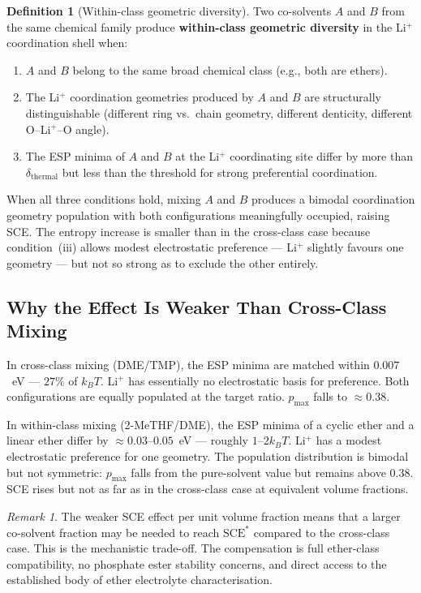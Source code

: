 \documentclass[11pt]{article}
\theoremstyle{plain}
\theoremstyle{definition}
\newtheorem{definition}{Definition}[section]
\theoremstyle{remark}
\newtheorem{remark}{Remark}[section]
\begin{document}
\begin{definition}[Within-class geometric diversity]
Two co-solvents $A$ and $B$ from the same chemical family produce
\textbf{within-class geometric diversity} in the Li$^+$ coordination
shell when:
\begin{enumerate}[label=(\roman*)]
  \item $A$ and $B$ belong to the same broad chemical class
        (e.g., both are ethers).
  \item The Li$^+$ coordination geometries produced by $A$ and $B$
        are structurally distinguishable (different ring vs.\ chain
        geometry, different denticity, different O--Li$^+$--O angle).
  \item The ESP minima of $A$ and $B$ at the Li$^+$ coordinating
        site differ by more than $\delta_{\mathrm{thermal}}$ but less
        than the threshold for strong preferential coordination.
\end{enumerate}
When all three conditions hold, mixing $A$ and $B$ produces a
bimodal coordination geometry population with both configurations
meaningfully occupied, raising SCE.  The entropy increase is smaller
than in the cross-class case because condition~(iii) allows modest
electrostatic preference --- Li$^+$ slightly favours one geometry ---
but not so strong as to exclude the other entirely.
\end{definition}

\subsection{Why the Effect Is Weaker Than Cross-Class Mixing}

In cross-class mixing (DME/TMP), the ESP minima are matched within
$0.007$~eV --- $27\%$ of $k_BT$.  Li$^+$ has essentially no
electrostatic basis for preference.  Both configurations are equally
populated at the target ratio.  $p_{\max}$ falls to $\approx 0.38$.

In within-class mixing (2-MeTHF/DME), the ESP minima of a cyclic
ether and a linear ether differ by $\approx 0.03$--$0.05$~eV ---
roughly $1$--$2 k_BT$.  Li$^+$ has a modest electrostatic preference
for one geometry.  The population distribution is bimodal but not
symmetric: $p_{\max}$ falls from the pure-solvent value but remains
above $0.38$.  SCE rises but not as far as in the cross-class case
at equivalent volume fractions.

\begin{remark}
The weaker SCE effect per unit volume fraction means that a larger
co-solvent fraction may be needed to reach $\mathrm{SCE}^{*}$
compared to the cross-class case.  This is the mechanistic trade-off.
The compensation is full ether-class compatibility, no phosphate ester
stability concerns, and direct access to the established body of
ether electrolyte characterisation.
\end{remark}
\end{document}
